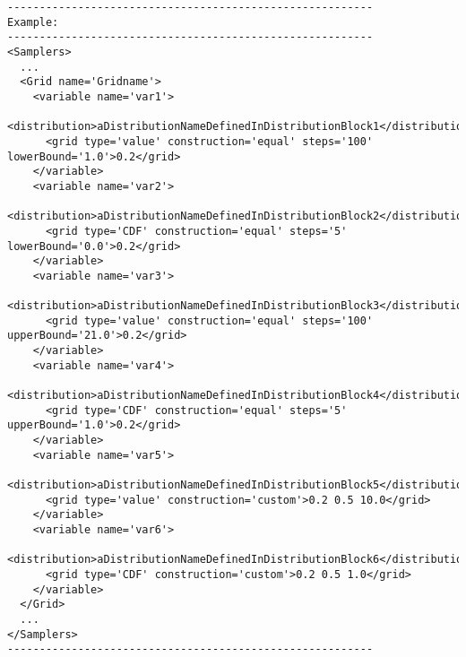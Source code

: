 \begin{lstlisting}[style=XML]
---------------------------------------------------------
Example:
---------------------------------------------------------
<Samplers>
  ...
  <Grid name='Gridname'> 
    <variable name='var1'> 
      <distribution>aDistributionNameDefinedInDistributionBlock1</distribution> 
      <grid	type='value' construction='equal' steps='100' lowerBound='1.0'>0.2</grid>	
    </variable> 
    <variable name='var2'> 
      <distribution>aDistributionNameDefinedInDistributionBlock2</distribution> 
      <grid	type='CDF' construction='equal' steps='5' lowerBound='0.0'>0.2</grid>	
    </variable>
    <variable name='var3'> 
      <distribution>aDistributionNameDefinedInDistributionBlock3</distribution> 
      <grid	type='value' construction='equal' steps='100' upperBound='21.0'>0.2</grid>	
    </variable> 
    <variable name='var4'> 
      <distribution>aDistributionNameDefinedInDistributionBlock4</distribution> 
      <grid	type='CDF' construction='equal' steps='5' upperBound='1.0'>0.2</grid>	
    </variable>
    <variable name='var5'> 
      <distribution>aDistributionNameDefinedInDistributionBlock5</distribution> 
      <grid	type='value' construction='custom'>0.2 0.5 10.0</grid>	
    </variable> 
    <variable name='var6'> 
      <distribution>aDistributionNameDefinedInDistributionBlock6</distribution> 
      <grid	type='CDF' construction='custom'>0.2 0.5 1.0</grid>	
    </variable>
  </Grid>
  ...
</Samplers>
---------------------------------------------------------
\end{lstlisting}
 
